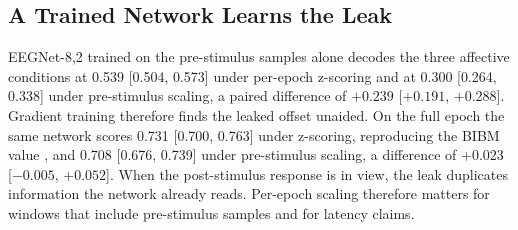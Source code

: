 \subsection{A Trained Network Learns the Leak}
EEGNet-8,2 trained on the pre-stimulus samples alone decodes the three affective conditions at 0.539 [0.504, 0.573] under per-epoch z-scoring and at 0.300 [0.264, 0.338] under pre-stimulus scaling, a paired difference of $+0.239$ [$+0.191$, $+0.288$]. Gradient training therefore finds the leaked offset unaided. On the full epoch the same network scores 0.731 [0.700, 0.763] under z-scoring, reproducing the BIBM value \cite{lane2026bibm}, and 0.708 [0.676, 0.739] under pre-stimulus scaling, a difference of $+0.023$ [$-0.005$, $+0.052$]. When the post-stimulus response is in view, the leak duplicates information the network already reads. Per-epoch scaling therefore matters for windows that include pre-stimulus samples and for latency claims.
